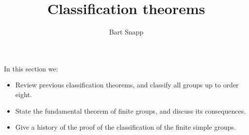 \documentclass{ximera}
\author{Bart Snapp}
\title{Classification theorems}
\begin{document}
\begin{abstract}
\end{abstract}
\maketitle
In this section we:

\begin{itemize}
\item Review previous classification theorems, and classify all groups
  up to order eight.
\item State the fundamental theorem of finite groups, and discuss its
  consequences.
\item Give a history of the proof of the classification of the finite
  simple groups.
\end{itemize}
\end{document}
